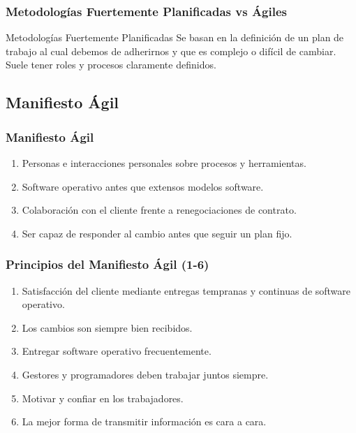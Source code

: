 \documentclass[animated,a4paper,slidestop,xcolor=pst,blue]{beamer}
\begin{document}
\begin{frame}[c]
    \frametitle{Metodologías Fuertemente Planificadas vs Ágiles}
    \begin{block}{Metodologías Fuertemente Planificadas}
        Se basan en la definición de un plan de trabajo al cual debemos de adherirnos y que es complejo o difícil de cambiar. Suele tener roles y procesos claramente
        definidos.
    \end{block}
\end{frame}

\subsection{Manifiesto Ágil}

\begin{frame}[c]
	\frametitle{Manifiesto Ágil}
	\begin{enumerate}[<+->]
		\item Personas e interacciones personales sobre procesos y herramientas.
		\item Software operativo antes que extensos modelos software.
		\item Colaboración con el cliente frente a renegociaciones de contrato.
		\item Ser capaz de responder al cambio antes que seguir un plan fijo.
	\end{enumerate}
\end{frame}

\begin{frame}[c]
	\frametitle{Principios del Manifiesto Ágil (1-6)}
	\begin{enumerate}[<+->]
		\item Satisfacción del cliente mediante entregas tempranas y continuas de software operativo.
		\item Los cambios son siempre bien recibidos.
		\item Entregar software operativo frecuentemente.
		\item Gestores y programadores deben trabajar juntos siempre.
		\item Motivar y confiar en los trabajadores.
		\item La mejor forma de transmitir información es cara a cara.
	\end{enumerate}
\end{frame}
\end{document}
